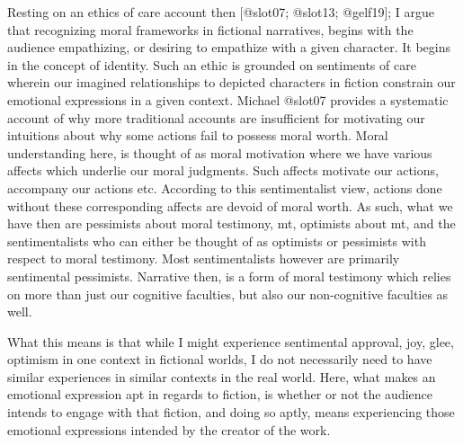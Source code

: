 \documentclass[
  letterpaper,
  DIV=11,
  numbers=noendperiod]{scrartcl}
\theoremstyle{remark}
\begin{document}
Resting on an ethics of care account then {[}@slot07; @slot13;
@gelf19{]}; I argue that recognizing moral frameworks in fictional
narratives, begins with the audience empathizing, or desiring to
empathize with a given character. It begins in the concept of identity.
Such an ethic is grounded on sentiments of care wherein our imagined
relationships to depicted characters in fiction constrain our emotional
expressions in a given context. Michael @slot07 provides a systematic
account of why more traditional accounts are insufficient for motivating
our intuitions about why some actions fail to possess moral worth. Moral
understanding here, is thought of as moral motivation where we have
various affects which underlie our moral judgments. Such affects
motivate our actions, accompany our actions etc. According to this
sentimentalist view, actions done without these corresponding affects
are devoid of moral worth. As such, what we have then are pessimists
about moral testimony, mt, optimists about mt, and the sentimentalists
who can either be thought of as optimists or pessimists with respect to
moral testimony. Most sentimentalists however are primarily sentimental
pessimists. Narrative then, is a form of moral testimony which relies on
more than just our cognitive faculties, but also our non-cognitive
faculties as well.

What this means is that while I might experience sentimental approval,
joy, glee, optimism in one context in fictional worlds, I do not
necessarily need to have similar experiences in similar contexts in the
real world. Here, what makes an emotional expression apt in regards to
fiction, is whether or not the audience intends to engage with that
fiction, and doing so aptly, means experiencing those emotional
expressions intended by the creator of the work.
\end{document}
